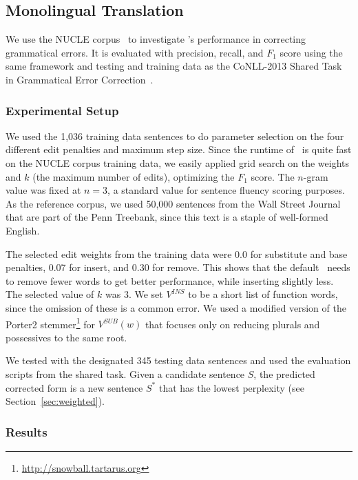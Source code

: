 \subsection{Monolingual Translation}

We use the NUCLE corpus~\cite{nucle} to investigate \sd's performance in
correcting grammatical errors. It is evaluated with precision, recall, and $F_1$
score using the same framework and testing and training data as the CoNLL-2013
Shared Task in Grammatical Error Correction~\cite{conll-shared}.

\subsubsection{Experimental Setup}

We used the 1,036 training data sentences to do parameter selection on the four
different edit penalties and maximum step size. Since the runtime of \sd~is
quite fast on the NUCLE corpus training data, we easily applied grid search on
the weights and $k$ (the maximum number of edits), optimizing the $F_1$ score.
The $n$-gram value was fixed at $n=3$, a standard value for sentence fluency
scoring purposes. As the reference corpus, we used 50,000 sentences from the
Wall Street Journal that are part of the Penn Treebank, since this text is a
staple of well-formed English.

The selected edit weights from the training data were 0.0 for substitute and
base penalties, 0.07 for insert, and 0.30 for remove. This shows that the
default \sd~needs to remove fewer words to get better performance, while
inserting slightly less. The selected value of $k$ was 3.
We set $V^{INS}$ to be a short list of function words, since the omission of
these is a common error. We used a modified version of the Porter2
stemmer\footnote{\url{http://snowball.tartarus.org}} for $V^{SUB}(w)$ that
focuses only on reducing plurals and possessives to the same root.

We tested with the designated 345 testing data sentences and used the evaluation
scripts from the shared task. Given a candidate sentence $S$, the predicted corrected
form is a new sentence $S^*$ that has the lowest perplexity (see Section~\ref{sec:weighted}).



\subsubsection{Results}

